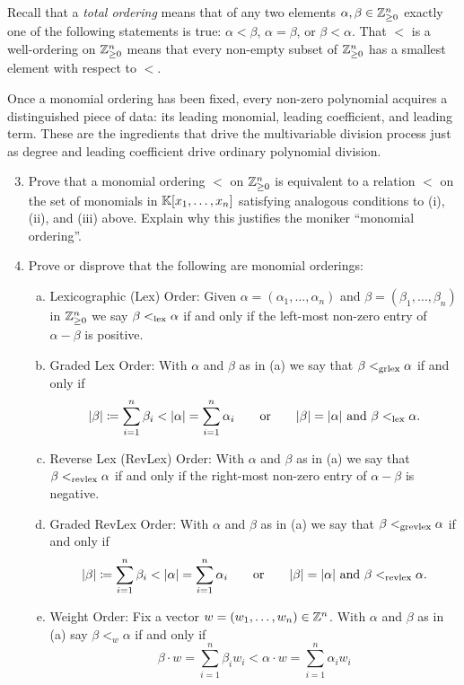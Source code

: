 \documentclass[12pt,reqno]{amsart}
\begin{document}
Recall that a \emph{total ordering} means that of any two elements $\alpha,\beta \in \mathbb{Z}^{n}_{\geq0}$ exactly one of the following statements is true: $\alpha < \beta$, $\alpha = \beta$, or $\beta < \alpha$. That $<$ is a well-ordering on $\mathbb{Z}^{n}_{\geq0}$  means that every non-empty subset of $\mathbb{Z}^{n}_{\geq0}$ has a smallest element with respect to $<$.

Once a monomial ordering has been fixed, every non-zero polynomial acquires a distinguished piece of data: its leading monomial, leading coefficient, and leading term. These are the ingredients that drive the multivariable division process just as degree and leading coefficient drive ordinary polynomial division.


\hrulefill 

\begin{enumerate}[leftmargin=*]
\setcounter{enumi}{2}

\item Prove that a monomial ordering $<$ on $\mathbb{Z}^{n}_{\geq0}$ is equivalent to a relation $<$ on the set of monomials in $\mathbb{K}[x_1,\ldots,x_n]$ satisfying analogous conditions to (i), (ii), and (iii) above. Explain why this justifies the moniker ``monomial ordering''.

\item Prove or disprove that the following are monomial orderings:
\begin{enumerate}[(a)]
	\item Lexicographic (Lex) Order: Given $\alpha=(\alpha_1,\ldots,\alpha_n)$ and $\beta=(\beta_1,\ldots,\beta_n)$ in $\mathbb{Z}^{n}_{\geq0}$ we say  $\beta <_{\operatorname{lex}} \alpha$ if and only if the left-most non-zero entry of $\alpha-\beta$ is positive.
	\item Graded Lex Order: With $\alpha$ and $\beta$ as in (a) we say that $\beta <_{\operatorname{grlex}} \alpha$ if and only if
	\[
	|\beta| \coloneqq \sum_{i=1}^{n} \beta_i < |\alpha| = \sum_{i=1}^{n} \alpha_{i} \quad \quad \text{or} \quad \quad |\beta| = |\alpha| \text{ and } \beta <_{\operatorname{lex}} \alpha.
	\]
	\item Reverse Lex (RevLex) Order: With $\alpha$ and $\beta$ as in (a) we say that $\beta <_{\operatorname{revlex}} \alpha$ if and only if the right-most non-zero entry of $\alpha-\beta$ is negative.
	\item Graded RevLex Order: With $\alpha$ and $\beta$ as in (a) we say that $\beta <_{\operatorname{grevlex}} \alpha$ if and only if
	\[
	|\beta| \coloneqq \sum_{i=1}^{n} \beta_i < |\alpha| = \sum_{i=1}^{n} \alpha_{i} \quad \quad \text{or} \quad \quad |\beta| = |\alpha| \text{ and } \beta <_{\operatorname{revlex}} \alpha.
	\]
	\item Weight Order: Fix a vector $w=(w_1,\ldots,w_n) \in \mathbb{Z}^{n}$. With $\alpha$ and $\beta$ as in (a) say $\beta <_{w} \alpha$ if and only if
	\[
	\beta\cdot w = \sum_{i=1}^{n}\beta_i w_i< \alpha \cdot w = \sum_{i=1}^{n} \alpha_i w_i
	\]
\end{enumerate}
\end{enumerate}
\end{document}
